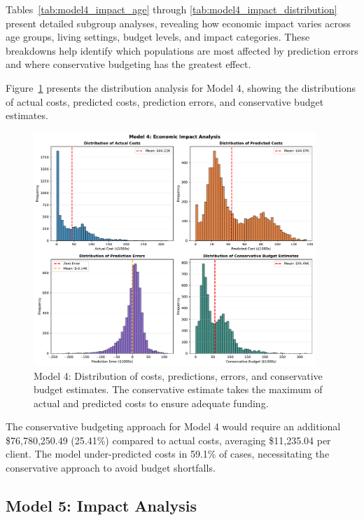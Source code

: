 Tables~\ref{tab:model4_impact_age} through \ref{tab:model4_impact_distribution} present detailed subgroup analyses, revealing how economic impact varies across age groups, living settings, budget levels, and impact categories. These breakdowns help identify which populations are most affected by prediction errors and where conservative budgeting has the greatest effect.

Figure~\ref{fig:model4_impact_histograms} presents the distribution analysis for Model 4, showing the distributions of actual costs, predicted costs, prediction errors, and conservative budget estimates.

\begin{figure}[htbp]
\centering
\includegraphics[width=0.95\textwidth]{figures/model_4_Impact_Histograms.pdf}
\caption{Model 4: Distribution of costs, predictions, errors, and conservative budget estimates. The conservative estimate takes the maximum of actual and predicted costs to ensure adequate funding.}
\label{fig:model4_impact_histograms}
\end{figure}

The conservative budgeting approach for Model 4 would require an additional \$76,780,250.49 (25.41\%) compared to actual costs, averaging \$11,235.04 per client. The model under-predicted costs in 59.1\% of cases, necessitating the conservative approach to avoid budget shortfalls. 

\clearpage

\subsection{Model 5: Impact Analysis}
\label{subsec:model5_impact}

